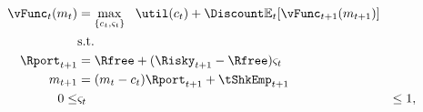   \begin{equation*}\begin{gathered}\begin{aligned}
    {\vFunc}_{t}({m}_{t})  & = \max_{\{{c}_{t},\varsigma_{t}\}}   ~~ \util({c}_{t}) +  \Discount
                                \Ex_{t}[{\vFunc}_{t+1}({m}_{t+1})]
    \\      & \text{s.t.} &
    \\      \Rport_{t+1}  & = \Rfree + (\Risky_{t+1}-\Rfree) \varsigma_{t}
    \\      {m}_{t+1}  & = ({m}_{t}-{c}_{t})\Rport_{t+1} + \tShkEmp_{t+1}
    \\  0       \leq & \varsigma_{t} & \leq 1, \label{eq:noshorts}
  \end{aligned}\end{gathered}\end{equation*}
